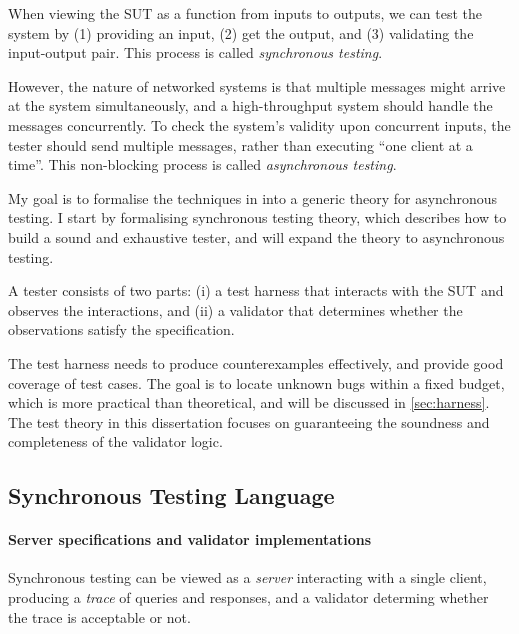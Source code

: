 \documentclass{article}
\theoremstyle{definition}
\begin{document}
When viewing the SUT as a function from inputs to outputs, we can test the
system by (1) providing an input, (2) get the output, and (3) validating the
input-output pair.  This process is called {\em synchronous testing}.

However, the nature of networked systems is that multiple messages might arrive
at the system simultaneously, and a high-throughput system should handle the
messages concurrently.  To check the system's validity upon concurrent inputs,
the tester should send multiple messages, rather than executing ``one client at
a time''.  This non-blocking process is called {\em asynchronous testing}.

My goal is to formalise the techniques in \textcite{issta21} into a generic
theory for asynchronous testing.  I start by formalising synchronous testing
theory, which describes how to build a sound and exhaustive tester, and will
expand the theory to asynchronous testing.

A tester consists of two parts: (i) a test harness that interacts with the SUT
and observes the interactions, and (ii) a validator that determines whether the
observations satisfy the specification.

The test harness needs to produce counterexamples effectively, and provide good
coverage of test cases.  The goal is to locate unknown bugs within a fixed
budget, which is more practical than theoretical, and will be discussed in
\autoref{sec:harness}.  The test theory in this dissertation focuses on
guaranteeing the soundness and completeness of the validator logic.

\subsection{Synchronous Testing Language}

\paragraph{Server specifications and validator implementations}
Synchronous testing can be viewed as a {\em server} interacting with a single
client, producing a {\em trace} of queries and responses, and a validator
determing whether the trace is acceptable or not.
\end{document}
